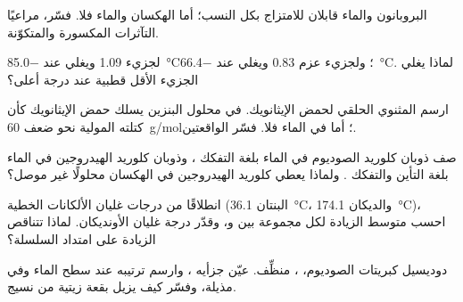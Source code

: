 \begin{exercise}[$\star\star$]\label{exo:b1:intermolecular-forces-solvents:7}
البروبانون والماء قابلان للامتزاج بكل النسب؛ أما الهكسان والماء
فلا. فسّر، مراعيًا التآثرات المكسورة والمتكوّنة.
\end{exercise}

\begin{exercise}[$\star\star$]\label{exo:b1:intermolecular-forces-solvents:8}
لجزيء   \qty{1.09}{\debye} ويغلي عند
\qty{-85.0}{\celsius}؛ ولجزيء  عزم \qty{0.83}{\debye} ويغلي عند
\qty{-66.4}{\celsius}. لماذا يغلي الجزيء الأقل قطبية عند درجة أعلى؟
\end{exercise}

\begin{exercise}[$\star\star$]\label{exo:b1:intermolecular-forces-solvents:9}
ارسم المثنوي الحلقي لحمض الإيثانويك. في محلول البنزين يسلك حمض
الإيثانويك كأن كتلته المولية نحو ضعف \qty{60}{g/mol}؛ أما في
الماء فلا. فسّر الواقعتين.
\end{exercise}

\begin{exercise}[$\star\star\star$]\label{exo:b1:intermolecular-forces-solvents:10}
صف ذوبان كلوريد الصوديوم في الماء بلغة
التفكك ، وذوبان كلوريد الهيدروجين في الماء بلغة
التأين والتفكك . ولماذا يعطي كلوريد
الهيدروجين في الهكسان محلولًا غير موصل؟
\end{exercise}

\begin{exercise}[$\star\star\star$]\label{exo:b1:intermolecular-forces-solvents:11}
انطلاقًا من درجات غليان الألكانات الخطية (البنتان
\qty{36.1}{\celsius}، والديكان \qty{174.1}{\celsius})، احسب متوسط
الزيادة لكل مجموعة  بين  و، وقدّر
درجة غليان الأونديكان. لماذا تتناقص الزيادة على امتداد
السلسلة؟
\end{exercise}

\begin{exercise}[$\star\star\star$]\label{exo:b1:intermolecular-forces-solvents:12}
دوديسيل كبريتات الصوديوم، ، منظِّف. عيّن
جزأيه  ، وارسم ترتيبه عند
سطح الماء وفي مذيلة، وفسّر كيف يزيل بقعة
زيتية من نسيج.
\end{exercise}


